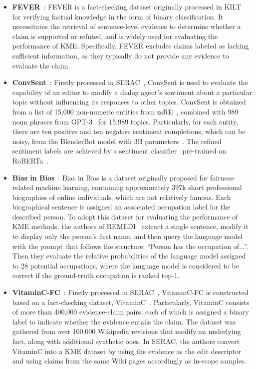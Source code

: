 \documentclass[acmsmall, screen]{acmart}
\begin{document}
\begin{itemize}[leftmargin=0.35cm]
\item \textbf{FEVER}~\cite{thorne-etal-2018-fever}: FEVER is a fact-checking dataset originally processed in KILT~\cite{petroni-etal-2021-kilt} for verifying factual knowledge in the form of binary classification. It necessitates the retrieval of sentence-level evidence to determine whether a claim is supported or refuted, and is widely used for evaluating the performance of KME. Specifically, FEVER excludes claims labeled as lacking sufficient information, as they typically do not provide any evidence to evaluate the claim. 

\item \textbf{ConvSent}~\cite{SERAC}: Firstly processed in SERAC~\cite{SERAC}, ConvSent is used to evaluate the capability of an editor to modify a dialog agent's sentiment about a particular topic without influencing its responses to other topics. ConvSent is obtained from a list of 15,000 non-numeric entities from zsRE~\cite{levy2017zero,cao2021editing}, combined with 989 noun phrases from GPT-3~\cite{brown2020language} for 15,989 topics. Particularly, for each entity, there are ten positive and ten negative sentiment completions, which can be noisy, from the BlenderBot model with 3B parameters~\cite{roller2021recipes}. The refined sentiment labels are achieved by a sentiment classifier~\cite{heitmann2020more} pre-trained on RoBERTa~\cite{liu2019roberta}. %

\item\textbf{Bias in Bios}~\cite{de2019bias}: Bias in Bios is a dataset originally proposed for fairness-related machine learning, containing approximately 397k short professional biographies of online individuals, which are not relatively famous. Each biographical sentence is assigned an associated occupation label for the described person. To adopt this dataset for evaluating the performance of KME methods, the authors of REMEDI~\cite{hernandez2023measuring} extract a single sentence, modify it to display only the person's first name, and then query the language model with the prompt that follows the structure: ``{Person} has the occupation of...''. Then they evaluate the relative probabilities of the language model assigned to 28 potential occupations, where the language model is considered to be correct if the ground-truth occupation is ranked top-1.

\item\textbf{VitaminC-FC}~\cite{schuster2021get}: Firstly processed in SERAC~\cite{SERAC}, VitaminC-FC is constructed based on a fact-checking dataset, VitaminC~\cite{schuster2021get}. Particularly, VitaminC consists of more than 400,000 evidence-claim pairs, each of which is assigned a binary label to indicate whether the evidence entails the claim. The dataset was gathered from over 100,000 Wikipedia
revisions that modify an underlying fact, along with additional synthetic ones. In SERAC, the authors convert VitaminC into a KME dataset by using the evidence as the edit descriptor and using claims from the same Wiki pages accordingly as in-scope samples.


\end{itemize}
\end{document}
